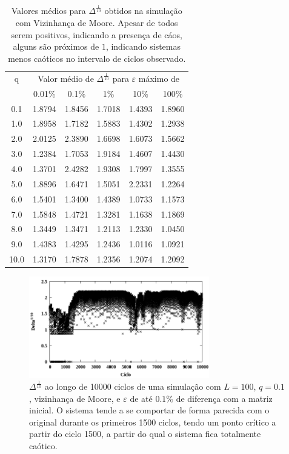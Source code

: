 \documentclass[12pt,a4paper,final]{article}
\begin{document}
 \begin{table}[h]
  \centering
  \begin{tabular}{c ccccc}
    \toprule
    q & \multicolumn{5}{c}{Valor médio de $\Delta^\frac{1}{10}$ para $\varepsilon$ máximo de}\\
     & 0.01\% & 0.1\% & 1\% & 10\% & 100\%\\\midrule
    0.1 & 1.8794	& 1.8456	& 1.7018	& 1.4393	& 1.8960\\
    1.0 & 1.8958	& 1.7182	& 1.5883	& 1.4302	& 1.2938\\
    2.0 & 2.0125	& 2.3890	& 1.6698	& 1.6073	& 1.5662\\
    3.0 & 1.2384	& 1.7053	& 1.9184	& 1.4607	& 1.4430\\
    4.0 & 1.3701	& 2.4282	& 1.9308	& 1.7997	& 1.3555\\
    5.0 & 1.8896	& 1.6471	& 1.5051	& 2.2331	& 1.2264\\
    6.0 & 1.5401	& 1.3400	& 1.4389	& 1.0733	& 1.1573\\
    7.0 & 1.5848	& 1.4721	& 1.3281	& 1.1638	& 1.1869\\
    8.0 & 1.3449	& 1.3471	& 1.2113	& 1.2330	& 1.0450\\
    9.0 & 1.4383	& 1.4295	& 1.2436	& 1.0116	& 1.0921\\
    10.0& 1.3170	& 1.7878	& 1.2356	& 1.2074	& 1.2092\\\bottomrule
  \end{tabular}
  \caption{Valores médios para $\Delta^\frac{1}{10}$ obtidos na simulação com Vizinhança de Moore. Apesar de todos serem positivos, indicando a presença de cáos, alguns são próximos de $1$, indicando sistemas menos caóticos no intervalo de ciclos observado.}
  \label{tab:mediaDelta}
  \end{table}

  \begin{figure}
    \centering
    \includegraphics[width=0.7\textwidth]{caosq01noise10.png}
    \caption{$\Delta^\frac{1}{10}$ ao longo de 10000 ciclos de uma simulação com $L=100$, $q=0.1$, vizinhança de Moore, e $\varepsilon$ de até $0.1\%$ de diferença com a matriz inicial. O sistema tende a se comportar de forma parecida com o original durante os primeiros 1500 ciclos, tendo um ponto crítico a partir do ciclo 1500, a partir do qual o sistema fica totalmente caótico.}
    \label{fig:caosq01noise10}
  \end{figure}
\end{document}
